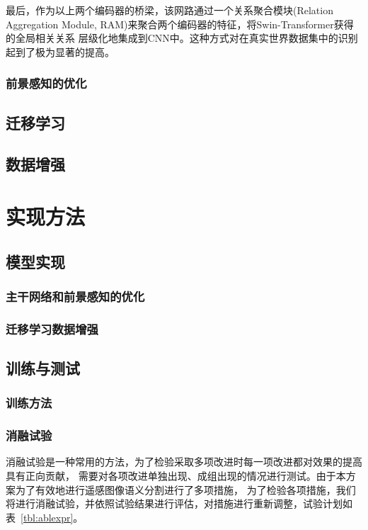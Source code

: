 \documentclass[a4paper,twoside,zihao=5,UTF8]{ctexrep}
\begin{document}
最后，作为以上两个编码器的桥梁，该网路通过一个关系聚合模块(Relation Aggregation Module, RAM)来聚合两个编码器的特征，将Swin-Transformer获得的全局相关关系
层级化地集成到CNN中。这种方式对在真实世界数据集中的识别起到了极为显著的提高\cite{stunet}。


\section{前景感知的优化}
\blindtext

\chapter{迁移学习}
\blindtext

\chapter{数据增强}
\blindtext


\part{实现方法}

\chapter{模型实现}

\section{主干网络和前景感知的优化}
\blindtext

\section{迁移学习数据增强}
\blindtext

\chapter{训练与测试}

\section{训练方法}
\blindtext

\section{消融试验}

消融试验是一种常用的方法，为了检验采取多项改进时每一项改进都对效果的提高具有正向贡献，
需要对各项改进单独出现、成组出现的情况进行测试。由于本方案为了有效地进行遥感图像语义分割进行了多项措施，
为了检验各项措施，我们将进行消融试验，并依照试验结果进行评估，对措施进行重新调整，试验计划如表~\ref{tbl:ablexpr}。
\end{document}
